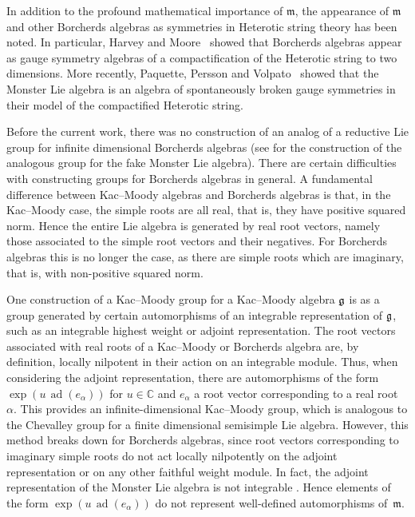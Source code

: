 \documentclass[11pt,letterpaper]{amsart}
\numberwithin{thecounter}{section}
\theoremstyle{definition}
\DeclareMathOperator{\ad}{ad}
\renewcommand{\a}{\alpha}
\newcommand{\C}{{\mathbb C}}
\newcommand{\m}{{\mathfrak{m}}}
\begin{document}
In addition to the profound mathematical importance of $\mathfrak{m}$, the appearance of $\mathfrak{m}$ and other Borcherds  algebras  as symmetries in Heterotic string theory has been noted. In particular, 
Harvey and Moore~\cite{HM1996} showed that Borcherds  algebras appear as  gauge symmetry algebras of a compactification of the Heterotic string  to two dimensions. 
More recently, Paquette, Persson and  Volpato~\cite{PPV2016} showed that the Monster Lie algebra is an algebra of spontaneously broken gauge symmetries in their model of the compactified Heterotic string. 

Before the current work, there was no construction of an analog of a reductive Lie group for infinite dimensional Borcherds  algebras (see \cite{Bo99} for the construction of %
the analogous group for the fake Monster Lie algebra).
%
There are certain difficulties with constructing groups for Borcherds  algebras in general. A fundamental difference between  Kac--Moody algebras and Borcherds  algebras is that, in the Kac--Moody case,  the  simple roots are all real, that is, they have positive squared norm. 
Hence the entire Lie algebra is generated by real root vectors, namely those associated to the simple root vectors and their negatives. 
For Borcherds  algebras this is no longer the case, as there are simple roots which are imaginary, that is, with non-positive squared norm. 

One construction of a Kac--Moody group for a Kac--Moody algebra $\frak g$ is as a group generated by certain automorphisms of an integrable representation of $\frak g$, such as an integrable highest weight or adjoint representation. The  root vectors associated with real roots of a Kac--Moody or Borcherds algebra are, by definition, locally nilpotent 
in their 
action on an integrable module. Thus, when considering the adjoint representation,  there are automorphisms of the form $\exp(u\,\ad(e_{\a}))$ for $u\in\C$ and $e_{\a}$ a root vector corresponding to a real root~$\a$. This provides an infinite-dimensional Kac--Moody group, which is analogous to  the Chevalley group for a finite dimensional semisimple Lie algebra. 
However, this method  breaks down for Borcherds  algebras, since root vectors  corresponding to  imaginary simple roots do not act locally nilpotently on the adjoint representation or on any other faithful weight module. 
In fact, the adjoint representation of the Monster Lie algebra is not integrable  \cite{jurisich1996exposition}. Hence elements of the form $\exp(u\,\ad(e_{\a}))$ do not represent well-defined automorphisms of~$\m$.
\end{document}
